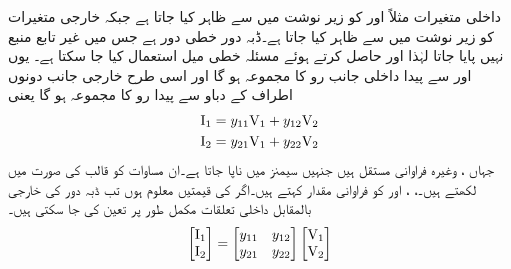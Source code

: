  داخلی متغیرات مثلاً  اور  کو زیر نوشت میں  سے ظاہر کیا جاتا ہے  جبکہ خارجی متغیرات کو زیر نوشت میں  سے ظاہر کیا جاتا ہے۔ڈبہ دور خطی دور ہے جس میں غیر تابع منبع نہیں پایا جاتا لہٰذا  اور  حاصل کرتے ہوئے مسئلہ خطی میل استعمال کیا جا سکتا ہے۔ یوں  اور  سے پیدا داخلی جانب رو کا مجموعہ  ہو گا اور اسی طرح خارجی جانب دونوں اطراف کے دباو سے پیدا رو کا مجموعہ  ہو گا یعنی
\begin{gather}
\begin{aligned}\label{مساوات_نمونہ_الف}
{\ensuremath{{\textup{I}}}}_1&=y_{11}{{\textup{V}}}_1+y_{12}{{\textup{V}}}_2\\
{{\textup{I}}}_2&=y_{21}{{\textup{V}}}_1+y_{22}{{\textup{V}}}_2
\end{aligned}
\end{gather}  
جہاں ،  وغیرہ فراوانی مستقل ہیں جنہیں سیمنز  میں ناپا جاتا ہے۔ان مساوات کو قالب کی صورت میں لکھتے ہیں۔، ،  اور  کو فراوانی مقدار  کہتے ہیں۔اگر  کی قیمتیں معلوم ہوں تب ڈبہ دور کی خارجی بالمقابل داخلی تعلقات مکمل طور پر تعین کی جا سکتی ہیں۔ 
\begin{align}\label{مساوات_نمونہ_ب}
\begin{bmatrix}
{\ensuremath{{\textup{I}}}}_1 \\
{{\textup{I}}}_2
\end{bmatrix}
=
\begin{bmatrix}
y_{11} & y_{12}\\
y_{21} & y_{22}
\end{bmatrix}
\begin{bmatrix}
{\ensuremath{{\textup{V}}}}_1\\
{{\textup{V}}}_2
\end{bmatrix}
\end{align}

